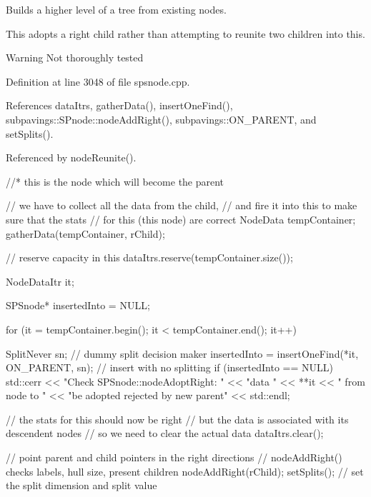 \-Builds a higher level of a tree from existing nodes. 

\-This adopts a right child rather than attempting to reunite two children into this. \begin{DoxyWarning}{\-Warning}
\-Not thoroughly tested 
\end{DoxyWarning}


\-Definition at line 3048 of file spsnode.\-cpp.



\-References data\-Itrs, gather\-Data(), insert\-One\-Find(), subpavings\-::\-S\-Pnode\-::node\-Add\-Right(), subpavings\-::\-O\-N\-\_\-\-P\-A\-R\-E\-N\-T, and set\-Splits().



\-Referenced by node\-Reunite().


\begin{DoxyCode}
    {
        //* this is the node which will become the parent

        // we have to collect all the data from the child,
        // and fire it into this to make sure that the stats
        // for this (this node) are correct
        NodeData tempContainer;
        gatherData(tempContainer, rChild);

        // reserve capacity in this
        dataItrs.reserve(tempContainer.size());

        NodeDataItr it;

        SPSnode* insertedInto = NULL;

        for (it = tempContainer.begin();
            it < tempContainer.end(); it++) {

            SplitNever sn; // dummy split decision maker
            insertedInto = insertOneFind(*it, ON_PARENT, sn);
            // insert with no splitting
            if (insertedInto == NULL) {
                std::cerr << "Check SPSnode::nodeAdoptRight: "
                    << "data " << **it << " from node to "
                    << "be adopted rejected by new parent"
                    << std::endl;
            }
        }

        // the stats for this should now be right
        // but the data is associated with its descendent nodes
        // so we need to clear the actual data
        dataItrs.clear();

        // point parent and child pointers in the right directions
        // nodeAddRight() checks labels, hull size, present children
        nodeAddRight(rChild);
        setSplits(); // set the split dimension and split value
    }
\end{DoxyCode}
